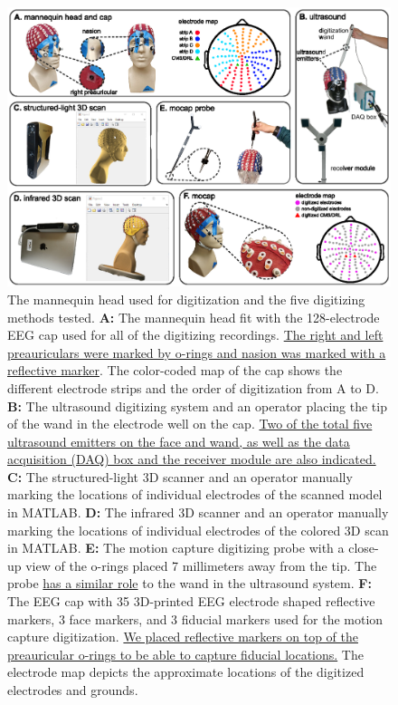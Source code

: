 \documentclass[../thesis_seyed.tex]{subfiles}
\begin{document}
\begin{figure}[bt!]
    \centering
    \includegraphics[width=\linewidth]{../img/method1-r2.eps}
    \caption{The mannequin head used for digitization and the five digitizing methods tested. \textbf{A:} The mannequin head fit with the 128-electrode EEG cap used for all of the digitizing recordings. \ul{The right and left preauriculars were marked by o-rings and nasion was marked with a reflective marker}. The color-coded map of the cap shows the different electrode strips and the order of digitization from A to D. \textbf{B:} The ultrasound digitizing system and an operator placing the tip of the wand in the electrode well on the cap. \ul{Two of the total five ultrasound emitters on the face and wand, as well as the data acquisition (DAQ) box and the receiver module are also indicated.} \textbf{C:} The structured-light 3D scanner and an operator manually marking the locations of individual electrodes of the scanned model in MATLAB. \textbf{D:} The infrared 3D scanner and an operator manually marking the locations of individual electrodes of the colored 3D scan in MATLAB. \textbf{E:} The motion capture digitizing probe with a close-up view of the o-rings placed 7 millimeters away from the tip. The probe \ul{has a similar role} to the wand in the ultrasound system. \textbf{F:} The EEG cap with 35 3D-printed EEG electrode shaped reflective markers, 3 face markers, and 3 fiducial markers used for the motion capture digitization. \ul{We placed reflective markers on top of the preauricular o-rings to be able to capture fiducial locations.} The electrode map depicts the approximate locations of the digitized electrodes and grounds.}
    \label{fig:m1}
\end{figure}
\end{document}

